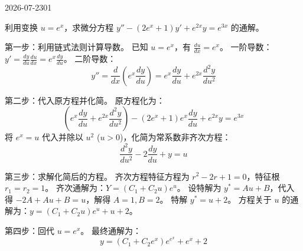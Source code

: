 \begin{mistake}{2026-07-23}{01}

\begin{problemcontent}
利用变换 \(u = e^x\)，求微分方程 \(y'' - (2e^x + 1)y' + e^{2x}y = e^{3x}\) 的通解。
\end{problemcontent}

\begin{solutioncontent}
第一步：利用链式法则计算导数。
已知 \(u = e^x\)，有 \(\frac{du}{dx} = e^x\)。
一阶导数：\(y' = \frac{dy}{du} \frac{du}{dx} = e^x \frac{dy}{du}\)。
二阶导数：
\[
y'' = \frac{d}{dx}\left(e^x \frac{dy}{du}\right) = e^x \frac{dy}{du} + e^{2x} \frac{d^2y}{du^2}
\]

第二步：代入原方程并化简。
原方程化为：
\[
\left(e^x \frac{dy}{du} + e^{2x} \frac{d^2y}{du^2}\right) - (2e^x + 1)e^x \frac{dy}{du} + e^{2x}y = e^{3x}
\]
将 \(e^x = u\) 代入并除以 \(u^2\) (\(u>0\))，化简为常系数非齐次方程：
\[
\frac{d^2y}{du^2} - 2\frac{dy}{du} + y = u
\]

第三步：求解化简后的方程。
齐次方程特征方程为 \(r^2 - 2r + 1 = 0\)，特征根 \(r_1 = r_2 = 1\)。
齐次通解为：\(Y = (C_1 + C_2 u)e^u\)。
设特解为 \(y^* = Au + B\)，代入得 \(-2A + Au + B = u\)，解得 \(A = 1, B = 2\)。
特解 \(y^* = u + 2\)。
方程关于 \(u\) 的通解为：\(y = (C_1 + C_2 u)e^u + u + 2\)。

第四步：回代 \(u = e^x\)。
最终通解为：
\[
y = (C_1 + C_2 e^x)e^{e^x} + e^x + 2
\]
\end{solutioncontent}


\end{mistake}
